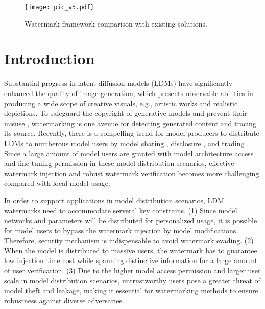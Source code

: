 \begin{figure}[t]
\centering
\texttt{[image: pic\_v5.pdf]} %
\caption{Watermark framework comparison with existing  solutions.}
\label{fig1}
\end{figure}

\section{Introduction}
Substantial progress in latent diffusion models (LDMs) \cite{croitoru2023diffusion} have significantly enhanced the quality of image generation, which presents observable abilities in producing a wide scope of creative visuals, e.g., artistic works and realistic depictions. 
To safeguard the copyright of generative models \cite{gowal2023identifying} and prevent their misuse \cite{barrett2023identifying}, watermarking is one avenue for detecting generated content and tracing its source. Recently, there is a compelling trend for  model producers  to distribute LDMs to numberous model users by model sharing \cite{donahue2021model}, disclosure \cite{azcoitia2022survey}, and trading \cite{pei2023data}. Since a large amount of model users are granted with model architecture access and fine-tuning permission in these model distribution scenarios, effective watermark injection and robust watermark verification becomes more challenging compared with local model usage. 

In order to support applications in  model distribution scenarios, LDM watermarks need to accommodate serveral key constrains. (1) Since model networks and parameters will be distributed for personalized usage, it is possible for model users to bypass the  watermark injection by model modifications. Therefore, security mechanism is indispensable to avoid watermark evading. (2) When the model is distributed to massive users, the watermark has to guarantee low injection time cost while spanning distinctive information for a large amount of user verification. (3) Due to the higher model access permission and larger user scale in model distribution scenarios, untrustworthy users pose a greater threat of model theft and leakage, making it essential for watermarking methods to ensure robustness against diverse adversaries. 


